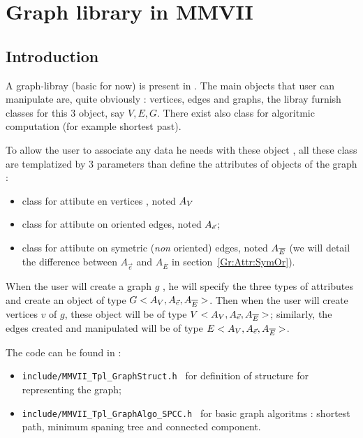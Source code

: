 


\chapter{Graph library in MMVII}



\section{Introduction}

A  graph-libray (basic for now) is present in \PPP.  The main objects that user can
manipulate are, quite obviously : vertices, edges and graphs, the libray
furnish classes for this $3$ object, say $V,E,G$.
There exist also class for algoritmic computation (for example shortest past).

To allow the user to associate any data he needs with these object , all these class
are templatized by $3$ parameters than define the attributes of objects of the graph :

\begin{itemize}
      \item  class for attibute en vertices , noted $A_V$
      \item  class for attibute on oriented edges, noted $A_{\vec{e}}$;
      \item  class for attibute on symetric (\emph{non} oriented) edges, noted $A_{\overline{E}}$ (we will detail the difference
             between  $A_{\vec{e}}$ and  $A_{\overline{E}}$ in section~\ref{Gr:Attr:SymOr}).
\end{itemize}

When the user will create a graph $g$ , he will specify the three types of attributes and create
an object of type $G<A_V,A_{\vec{e}},A_{\overline{E}}>$.  Then when the user will create
vertices $v$ of $g$, these object will be of type $V<A_V,A_{\vec{e}},A_{\overline{E}}>$;
similarly, the edges created and manipulated  will be of type $E<A_V,A_{\vec{e}},A_{\overline{E}}>$.

The code can be found in :

\begin{itemize}
    \item {\tt include/MMVII\_Tpl\_GraphStruct.h } for definition of structure for representing the graph;
    \item {\tt include/MMVII\_Tpl\_GraphAlgo\_SPCC.h } for basic graph algoritms : shortest path, minimum
          spaning tree and connected component.
\end{itemize}

